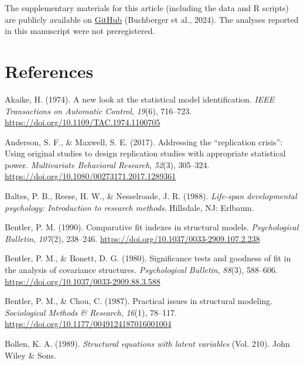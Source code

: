 \documentclass[
  man,floatsintext]{apa6}
\newlength{\cslhangindent}
\newlength{\cslentryspacingunit} %
\newenvironment{CSLReferences}[2] %
 {%
  \setlength{\parindent}{0pt}
  \ifodd #1
  \let\oldpar\par
  \def\par{\hangindent=\cslhangindent\oldpar}
  \fi
  \setlength{\parskip}{#2\cslentryspacingunit}
 }%
 {}
\begin{document}
The supplementary materials for this article (including the data and R scripts) are publicly available on \href{https://github.com/ebuchberger/Estimating-Power-for-SEM}{GitHub} (Buchberger et al., 2024). The analyses reported in this manuscript were not preregistered.

\hypertarget{references}{%
\section{References}\label{references}}

\hypertarget{refs}{}
\begin{CSLReferences}{1}{0}
\leavevmode{}%
Akaike, H. (1974). A new look at the statistical model identification. \emph{{IEEE} Transactions on Automatic Control}, \emph{19}(6), 716--723. \url{https://doi.org/10.1109/TAC.1974.1100705}

\leavevmode{}%
Anderson, S. F., \& Maxwell, S. E. (2017). Addressing the {``replication crisis''}: Using original studies to design replication studies with appropriate statistical power. \emph{Multivariate Behavioral Research}, \emph{52}(3), 305--324. \url{https://doi.org/10.1080/00273171.2017.1289361}

\leavevmode{}%
Baltes, P. B., Reese, H. W., \& Nesselroade, J. R. (1988). \emph{Life-span developmental psychology: Introduction to research methods}. Hillsdale, {NJ}: Erlbaum.

\leavevmode{}%
Bentler, P. M. (1990). Comparative fit indexes in structural models. \emph{Psychological Bulletin}, \emph{107}(2), 238--246. \url{https://doi.org/10.1037/0033-2909.107.2.238}

\leavevmode{}%
Bentler, P. M., \& Bonett, D. G. (1980). Significance tests and goodness of fit in the analysis of covariance structures. \emph{Psychological Bulletin}, \emph{88}(3), 588--606. \url{https://doi.org/10.1037/0033-2909.88.3.588}

\leavevmode{}%
Bentler, P. M., \& Chou, C. (1987). Practical issues in structural modeling. \emph{Sociological Methods \& Research}, \emph{16}(1), 78--117. \url{https://doi.org/10.1177/0049124187016001004}

\leavevmode{}%
Bollen, K. A. (1989). \emph{Structural equations with latent variables} (Vol. 210). John Wiley \& Sons.


\end{CSLReferences}
\end{document}
